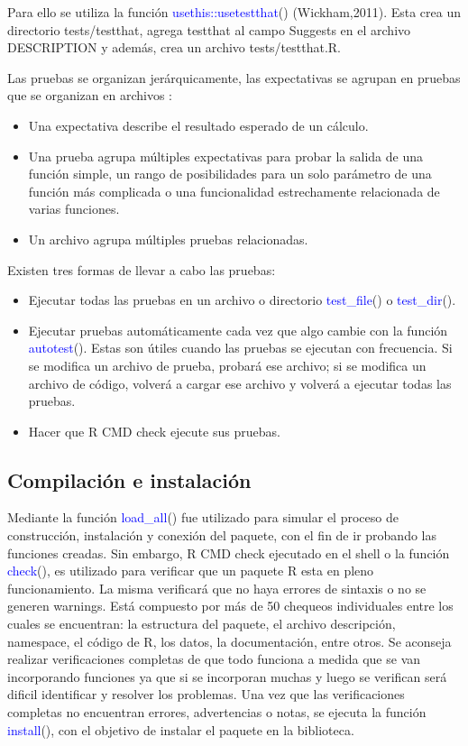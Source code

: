Para ello se utiliza la función \textcolor{blue}{usethis::usetestthat}() (Wickham,2011). Esta crea un directorio tests/testthat, agrega testthat al campo Suggests en el archivo DESCRIPTION y además, crea un archivo tests/testthat.R. 

Las pruebas se organizan jerárquicamente, las expectativas se agrupan en pruebas que se organizan en archivos :
\begin{itemize}
\item Una expectativa describe el resultado esperado de un cálculo.

\item Una prueba agrupa múltiples expectativas para probar la salida de una función simple, un rango de posibilidades para un solo parámetro de una función más complicada o una funcionalidad estrechamente relacionada de varias funciones.

\item Un archivo agrupa múltiples pruebas relacionadas.
\end{itemize}


Existen tres formas de llevar a cabo las pruebas:
\begin{itemize}
\item Ejecutar todas las pruebas en un archivo o directorio \textcolor{blue}{test\_file}() o \textcolor{blue}{test\_dir}().
\item Ejecutar pruebas automáticamente cada vez que algo cambie con la función \textcolor{blue}{autotest}(). Estas son útiles cuando las pruebas se ejecutan con frecuencia. Si se modifica un archivo de prueba, probará ese archivo; si se modifica un archivo de código, volverá a cargar ese archivo y volverá a ejecutar todas las pruebas.
\item Hacer que R CMD check ejecute sus pruebas.
\end{itemize}


\subsection{Compilación e instalación}

Mediante la función \textcolor{blue}{load\_all}() fue utilizado para simular el proceso de construcción, instalación y conexión del paquete, con el fin de ir probando las funciones creadas. Sin embargo, R CMD check ejecutado en el shell o la función \textcolor{blue}{check}(), es utilizado para verificar que un paquete R esta en pleno funcionamiento. La misma verificará que no haya errores de sintaxis o no se generen warnings. Está compuesto por más de 50 chequeos individuales entre los cuales se encuentran: la estructura del paquete, el archivo descripción, namespace, el código de R, los datos, la documentación, entre otros. Se aconseja realizar verificaciones completas de que todo funciona a medida que se van incorporando funciones ya que si se incorporan muchas y luego se verifican será dificil identificar y resolver los problemas. Una vez que las verificaciones completas no encuentran errores, advertencias o notas, se ejecuta la función \textcolor{blue}{install}(), con el objetivo de instalar el paquete en la biblioteca.


